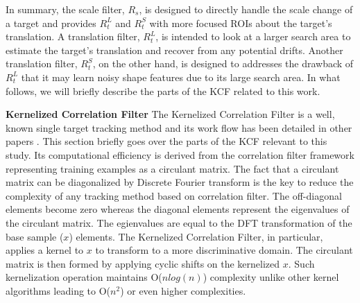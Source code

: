 \documentclass{bmvc2k}
\begin{document}
In summary, the scale filter, $R_{s}$, is designed to directly handle
the scale change of a target and provides $R_{t}^{L}$ and $R_{t}^{S}$
with more focused ROIs about the target's translation. A translation
filter, $R_{t}^{L}$, is intended to look at a larger search area to
estimate the target's translation and recover from any potential
drifts. Another translation filter, $R_{t}^{S}$, on the other hand, is
designed to addresses the drawback of $R_{t}^{L}$ that it may learn
noisy shape features due to its large search area. In what follows, we
will briefly describe the parts of the KCF related to this work.

\textbf{Kernelized Correlation Filter} The Kernelized Correlation
Filter is a well, known single target tracking method and its work
flow has been detailed in other papers
\cite{henriques2012exploiting,henriques2015high}. This section briefly
goes over the parts of the KCF relevant to this study. Its
computational efficiency is derived from the correlation filter
framework representing training examples as a circulant matrix. The
fact that a circulant matrix can be diagonalized by Discrete Fourier
transform is the key to reduce the complexity of any tracking method
based on correlation filter. The off-diagonal elements become zero
whereas the diagonal elements represent the eigenvalues of the
circulant matrix. The egienvalues are equal to the DFT transformation
of the base sample ($x$) elements. The Kernelized Correlation Filter,
in particular, applies a kernel to $x$ to transform to a more
discriminative domain. The circulant matrix is then formed by applying
cyclic shifts on the kernelized $x$. Such kernelization operation
maintains O($nlog(n)$) complexity unlike other kernel algorithms
leading to O($n^{2}$) or even higher complexities.
\end{document}
